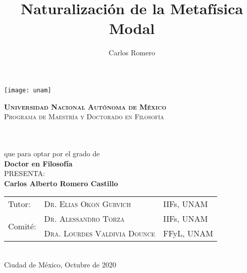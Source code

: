 \documentclass[12pt,letterpaper]{book}
\author{Carlos Romero}
\title{Naturalización de la Metafísica Modal}
\begin{document}
\frontmatter

\begin{titlepage}
\begin{tcolorbox}[enhanced,spread=1pt,interior style={top color=white,bottom color=white}
]
	\vspace{3cm}
	\begin{center}
	\texttt{[image: unam]}
	\end{center}
	\begin{minipage}[c][0.1\textheight][t]{1\textwidth}
		\begin{center}
			\vspace{.7cm}
			{\sffamily\Large \bfseries \scshape {Universidad Nacional Aut\'onoma de M\'exico}}\\
			\vspace{.2cm}
			{\sffamily\scshape Programa de Maestría y Doctorado en Filosofía}
		\end{center}
	\end{minipage}
	\begin{minipage}[c][0.6\textheight][t]{1\textwidth}
		\begin{center}
			\vspace{1.7cm}
			{\sffamily\LARGE\scshape\bfseries {}}\\
			\vspace{1.7cm}
			  \\%
			{\sffamily que para optar por el grado de} \\[5pt]
			{\sffamily \large \textbf{Doctor en Filosof\'ia}}\\[40pt]            
			{\sffamily PRESENTA:}\\[5pt]
			{\sffamily \large \textbf{Carlos Alberto Romero Castillo}}\\
			\vspace{1cm}
				\begin{tabular}{l l l}
				{\sffamily Tutor:} & {\sffamily\scshape Dr. Elias Okon Gurvich} & {\sffamily\small IIFs, UNAM}\\
				\multirow{2}{*}{\sffamily Comit\'e:} & {\sffamily\scshape Dr. Alessandro Torza} & {\sffamily\small IIFs, UNAM}\\
				& {\sffamily\scshape Dra. Lourdes Valdivia Dounce} & {\sffamily\small FFyL, UNAM}\\
				\end{tabular}	\\
			\vspace{0.5cm}
			{\sffamily Ciudad de M\'exico,}{ }{\sffamily Octubre de 2020} 	
		\end{center}
	\end{minipage}
\end{tcolorbox}
\end{titlepage}
\end{document}
